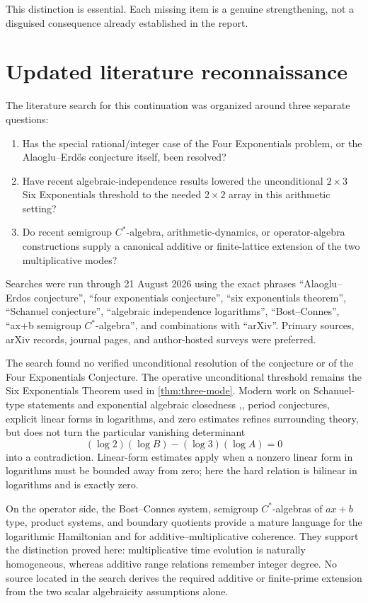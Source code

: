 \documentclass[11pt,oneside]{article}
\theoremstyle{definition}
\theoremstyle{remark}
\begin{document}
This distinction is essential.  Each missing item is a genuine
strengthening, not a disguised consequence already established in the
report.

\section{Updated literature reconnaissance}

The literature search for this continuation was organized around three
separate questions:

\begin{enumerate}
\item Has the special rational/integer case of the Four Exponentials
      problem, or the Alaoglu--Erd\H{o}s conjecture itself, been resolved?
\item Have recent algebraic-independence results lowered the unconditional
      \(2\times3\) Six Exponentials threshold to the needed \(2\times2\)
      array in this arithmetic setting?
\item Do recent semigroup \(C^*\)-algebra, arithmetic-dynamics, or
      operator-algebra constructions supply a canonical additive or
      finite-lattice extension of the two multiplicative modes?
\end{enumerate}

Searches were run through 21 August 2026 using the exact phrases
``Alaoglu--Erdos conjecture'', ``four exponentials conjecture'',
``six exponentials theorem'', ``Schanuel conjecture'', ``algebraic
independence logarithms'', ``Bost--Connes'', ``ax+b semigroup
\(C^*\)-algebra'', and combinations with ``arXiv''.  Primary sources,
arXiv records, journal pages, and author-hosted surveys were preferred.

The search found no verified unconditional resolution of the conjecture
or of the Four Exponentials Conjecture.  The operative unconditional
threshold remains the Six Exponentials Theorem used in
\cref{thm:three-mode}.  Modern work on Schanuel-type statements and
exponential algebraic closedness \cite{Kirby2010,WaldschmidtOpen},, period conjectures, explicit linear
forms in logarithms, and zero estimates refines surrounding theory, but
does not turn the particular vanishing determinant
\[
        (\log2)(\log B)-(\log3)(\log A)=0
\]
into a contradiction.  Linear-form estimates apply when a nonzero
linear form in logarithms must be bounded away from zero; here the hard
relation is bilinear in logarithms and is exactly zero.

On the operator side, the Bost--Connes system, semigroup
\(C^*\)-algebras of \(ax+b\) type, product systems, and boundary
quotients provide a mature language for the logarithmic Hamiltonian and
for additive--multiplicative coherence.  They support the distinction
proved here: multiplicative time evolution is naturally homogeneous,
whereas additive range relations remember integer degree.  No source
located in the search derives the required additive or finite-prime
extension from the two scalar algebraicity assumptions alone.
\end{document}
